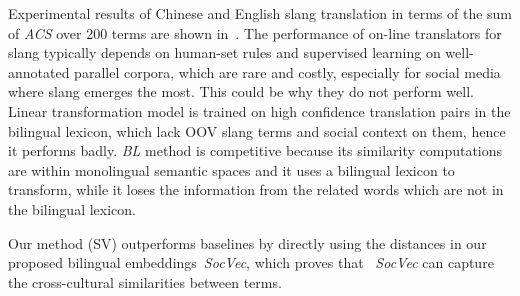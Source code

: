 Experimental results of Chinese and English slang translation in terms of the sum of \textit{ACS} over 200 terms are shown in~.
The performance of on-line translators for slang typically depends on human-set rules and supervised learning on well-annotated parallel corpora, which are rare and costly, especially for social media where slang emerges the most. This could be why they do not perform well. 
Linear transformation model is trained on high confidence translation pairs 
in the bilingual lexicon, which lack OOV slang terms and social context on them, 
hence it performs badly.
\textit{BL} method is competitive because its similarity computations 
are within monolingual semantic spaces and it uses a bilingual lexicon 
to transform, while it loses the information from the related words 
which are not in the bilingual lexicon.

Our method (SV) outperforms baselines by directly using the distances in 
our proposed bilingual embeddings~\textit{SocVec}, which proves 
that ~\textit{SocVec} can capture the cross-cultural similarities between terms.

